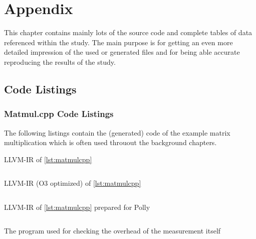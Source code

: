 \chapter{Appendix}
This chapter contains mainly lots of the source code and complete tables of data referenced within the study.
The main purpose is for getting an even more detailed impression of the used or generated files and for being able accurate reproducing the results of the study.

\section{Code Listings}
\subsection{Matmul.cpp Code Listings}
The following listings contain the (generated) code of the example matrix multiplication which is often used throuout the background chapters.
\begin{code}
    \caption{LLVM-IR of \autoref{lst:matmulcpp}}
    \inputminted{LLVM}{ll/matmul.ll}
    \label{lst:matmulll}
\end{code}
\begin{code}
    \caption{LLVM-IR (O3 optimized) of \autoref{lst:matmulcpp}}
    \inputminted{LLVM}{ll/matmulO3.ll}
    \label{lst:matmulllO3}
\end{code}
\begin{code}
    \caption{LLVM-IR of \autoref{lst:matmulcpp} prepared for Polly}
    \inputminted{LLVM}{ll/matmul.preopt.ll}
    \label{lst:matmulpreoptll}
\end{code}
\begin{code}
    \caption[Program for checking overhead]{The program used for checking the overhead of the measurement itself}
    \inputminted{c++}{cpp/checkMeasurementOverhead.cpp}
    \label{lst:checkOverhead}
\end{code}

